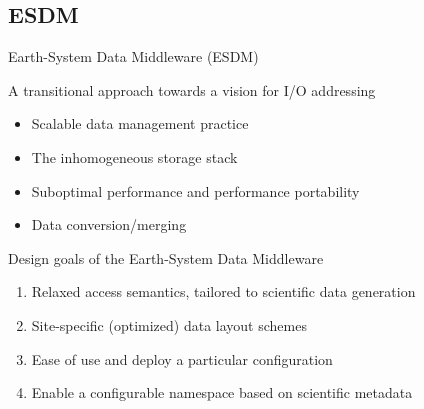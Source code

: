 \documentclass[compress,11pt,xcolor=svgnames,aspectratio=169]{beamer}
\begin{document}
\subsection{ESDM}

\begin{frame}[fragile]{Earth-System Data Middleware (ESDM)}

\begin{block}{A transitional approach towards a vision for I/O addressing}
\begin{itemize}
\setlength\itemsep{0.1cm}
  \item Scalable data management practice
  \item The inhomogeneous storage stack
  \item Suboptimal performance and performance portability
  \item Data conversion/merging
\end{itemize}
\end{block}

\begin{block}{Design goals of the Earth-System Data Middleware}
\begin{enumerate}
\setlength\itemsep{0.1cm}
  \item Relaxed access semantics, tailored to scientific data generation
  \item Site-specific (optimized) data layout schemes
  \item Ease of use and deploy a particular configuration
  \item Enable a configurable namespace based on scientific metadata
\end{enumerate}
\end{block}

\end{frame}
\end{document}
